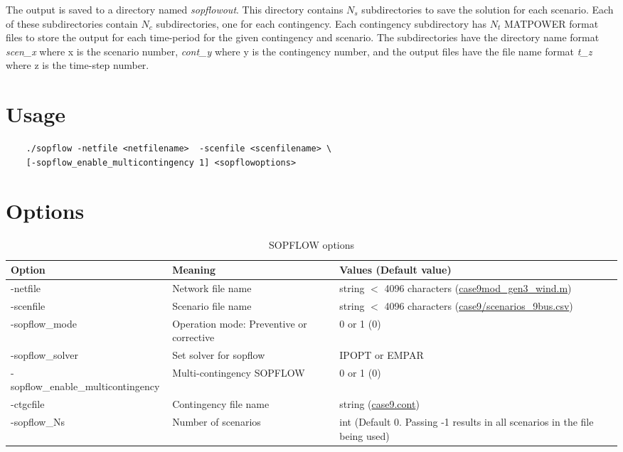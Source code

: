 The \sopflow output is saved to a directory named \emph{sopflowout}. This directory contains $N_s$ subdirectories to save the solution for each scenario. Each of these subdirectories contain $N_c$ subdirectories, one for each contingency. Each contingency subdirectory has $N_t$ MATPOWER format files to store the output for each time-period for the given contingency and scenario. The subdirectories have the directory name format \emph{scen\_x} where x is the scenario number,  \emph{cont\_y} where y is the contingency number, and the output files have the file name format \emph{t\_z} where z is the time-step number.

\section{Usage}
\begin{lstlisting}
    ./sopflow -netfile <netfilename>  -scenfile <scenfilename> \
    [-sopflow_enable_multicontingency 1] <sopflowoptions>
\end{lstlisting}

\section{Options}

\begin{table}[!htbp]
  \caption{SOPFLOW options}
  \small
  \begin{tabular}{|p{}|p{}|p{}|}
    \hline
    \textbf{Option} & \textbf{Meaning} & \textbf{Values (Default value)} \\ \hline
    -netfile & Network file name & string $<$ 4096 characters (\href{https://gitlab.pnnl.gov/exasgd/frameworks/exago/-/blob/master/datafiles/case9/case9mod_gen3_wind.m}{case9mod\_gen3\_wind.m}) \\ \hline
    -scenfile & Scenario file name & string $<$ 4096 characters (\href{https://gitlab.pnnl.gov/exasgd/frameworks/exago/-/blob/master/datafiles/case9/scenarios_9bus.csv}{case9/scenarios\_9bus.csv}) \\ \hline
    -sopflow\_mode & Operation mode: Preventive or corrective & 0 or 1 (0) \\ \hline
    -sopflow\_solver & Set solver for sopflow & IPOPT or  EMPAR \\ \hline
    -sopflow\_enable\_multicontingency & Multi-contingency SOPFLOW & 0 or 1 (0) \\ \hline \hline
    -ctgcfile & Contingency file name & string (\href{https://gitlab.pnnl.gov/exasgd/frameworks/exago/-/blob/master/datafiles/case9/case9.cont}{case9.cont}) \\ \hline
    -sopflow\_Ns & Number of scenarios & int (Default 0. Passing -1 results in all scenarios in the file being used) \\ \hline
  \end{tabular}
  \label{tab:sopflow_options}
\end{table}


